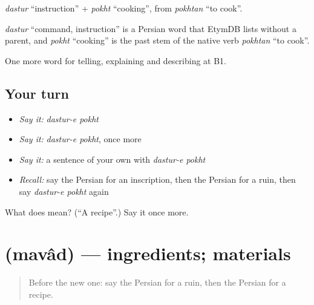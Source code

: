 \emph{dastur} \textquotedblleft{}instruction\textquotedblright{} + \emph{pokht} \textquotedblleft{}cooking\textquotedblright{}, from \emph{pokhtan} \textquotedblleft{}to cook\textquotedblright{}.

\begin{cousinweb}
\emph{dastur} \textquotedblleft{}command, instruction\textquotedblright{} is a Persian word that EtymDB lists without a parent, and \emph{pokht} \textquotedblleft{}cooking\textquotedblright{} is the past stem of the native verb \emph{pokhtan} \textquotedblleft{}to cook\textquotedblright{}.
\end{cousinweb}

\begin{grammarlens}[title={What you've built}]
One more word for telling, explaining and describing at B1.
\end{grammarlens}

\subsection*{Your turn}
\begin{itemize}
\raggedright
  \item \emph{Say it:} \emph{dastur-e pokht}
  \item \emph{Say it:} \emph{dastur-e pokht}, once more
  \item \emph{Say it:} a sentence of your own with \emph{dastur-e pokht}
  \item \emph{Recall:} say the Persian for an inscription, then the Persian for a ruin, then say \emph{dastur-e pokht} again
\end{itemize}

\begin{tcolorbox}[breakable,colback=teal!4,colframe=teal!35!black,title={Before you move on}]
What does   mean? (\textquotedblleft{}A recipe\textquotedblright{}.) Say it once more.
\end{tcolorbox}
\section[\texorpdfstring{\fa{مواد} (mavâd)}{مواد (mavâd)}]{ (mavâd) — ingredients; materials}

\label{lesson:FA-C355-mavad}



\begin{quote}
Before the new one: say the Persian for a ruin, then the Persian for a recipe.
\end{quote}


